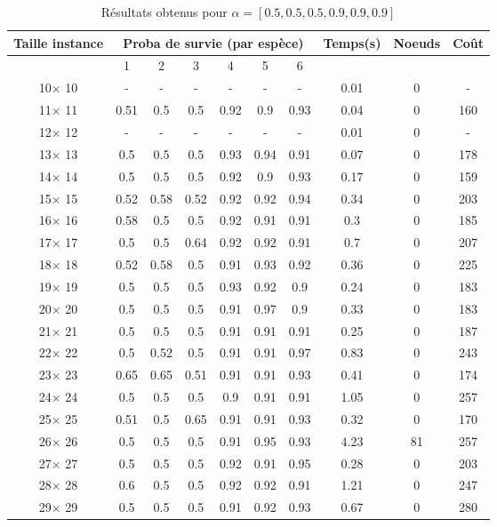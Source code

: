 \documentclass[main.tex]{subfiles}
\begin{document}
\begin{table}
    \centering
    \caption{Résultats obtenus pour $\alpha = [0.5, 0.5, 0.5, 0.9, 0.9, 0.9]$}
    \begin{tabular}{|c|c|c|c|c|c|c|c|c|c|}
	\hline
	\textbf{Taille instance} &\multicolumn{6}{c}{\textbf{Proba de survie (par espèce)}} &\textbf{Temps(s)} &\textbf{Noeuds} &\textbf{Coût}\\
	\hline
	 &1 &2 &3 &4 &5 &6 & & &\\
	\hline

10$\times$ 10 & -  & -  & -  & -  & -  & -  &0.01 &0 & - \\
11$\times$ 11 &0.51 &0.5 &0.5 &0.92 &0.9 &0.93 &0.04 &0 &160\\
12$\times$ 12 & -  & -  & -  & -  & -  & -  &0.01 &0 & - \\
13$\times$ 13 &0.5 &0.5 &0.5 &0.93 &0.94 &0.91 &0.07 &0 &178\\
14$\times$ 14 &0.5 &0.5 &0.5 &0.92 &0.9 &0.93 &0.17 &0 &159\\
15$\times$ 15 &0.52 &0.58 &0.52 &0.92 &0.92 &0.94 &0.34 &0 &203\\
16$\times$ 16 &0.58 &0.5 &0.5 &0.92 &0.91 &0.91 &0.3 &0 &185\\
17$\times$ 17 &0.5 &0.5 &0.64 &0.92 &0.92 &0.91 &0.7 &0 &207\\
18$\times$ 18 &0.52 &0.58 &0.5 &0.91 &0.93 &0.92 &0.36 &0 &225\\
19$\times$ 19 &0.5 &0.5 &0.5 &0.93 &0.92 &0.9 &0.24 &0 &183\\
20$\times$ 20 &0.5 &0.5 &0.5 &0.91 &0.97 &0.9 &0.33 &0 &183\\
21$\times$ 21 &0.5 &0.5 &0.5 &0.91 &0.91 &0.91 &0.25 &0 &187\\
22$\times$ 22 &0.5 &0.52 &0.5 &0.91 &0.91 &0.97 &0.83 &0 &243\\
23$\times$ 23 &0.65 &0.65 &0.51 &0.91 &0.91 &0.93 &0.41 &0 &174\\
24$\times$ 24 &0.5 &0.5 &0.5 &0.9 &0.91 &0.91 &1.05 &0 &257\\
25$\times$ 25 &0.51 &0.5 &0.65 &0.91 &0.91 &0.93 &0.32 &0 &170\\
26$\times$ 26 &0.5 &0.5 &0.5 &0.91 &0.95 &0.93 &4.23 &81 &257\\
27$\times$ 27 &0.5 &0.5 &0.5 &0.92 &0.91 &0.95 &0.28 &0 &203\\
28$\times$ 28 &0.6 &0.5 &0.5 &0.92 &0.92 &0.91 &1.21 &0 &247\\
29$\times$ 29 &0.5 &0.5 &0.5 &0.91 &0.92 &0.93 &0.67 &0 &280\\

\end{tabular}
\end{table}
\end{document}
